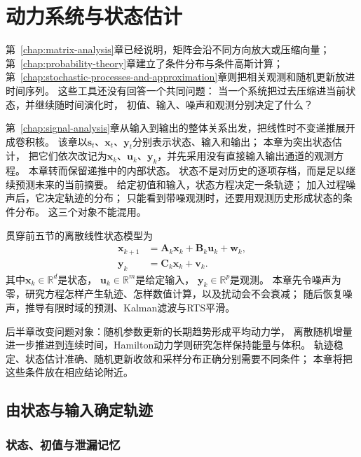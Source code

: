 \chapter{动力系统与状态估计}
\label{chap:dynamical-systems-and-state-estimation}

第~\ref{chap:matrix-analysis}章已经说明，矩阵会沿不同方向放大或压缩向量； 第~\ref{chap:probability-theory}章建立了条件分布与条件高斯计算；
第~\ref{chap:stochastic-processes-and-approximation}章则把相关观测和随机更新放进时间序列。
这些工具还没有回答一个共同问题： 当一个系统把过去压缩进当前状态，并继续随时间演化时，
初值、输入、噪声和观测分别决定了什么？

第~\ref{chap:signal-analysis}章从输入到输出的整体关系出发，把线性时不变递推展开成卷积核。
该章以$\bm{s}_{t}$、$\bm{x}_{t}$、$\bm{y}_{t}$分别表示状态、输入和输出； 本章为突出状态估计，
把它们依次改记为$\bm{x}_{k}$、$\bm{u}_{k}$、$\bm{y}_{k}$，并先采用没有直接输入输出通道的观测方程。
本章转而保留递推中的内部状态。 状态不是对历史的逐项存档，而是足以继续预测未来的当前摘要。
给定初值和输入，状态方程决定一条轨迹； 加入过程噪声后，它决定轨迹的分布； 只能看到带噪观测时，还要用观测历史形成状态的条件分布。
这三个对象不能混用。

贯穿前五节的离散线性状态模型为
\begin{align}
	\bm{x}_{k+1} & = \bm{A}_{k}\bm{x}_{k}+\bm{B}_{k}\bm{u}_{k}+\bm{w}_{k}, \label{eq:dynamical-linear-state-model} \\
	\bm{y}_{k}   & = \bm{C}_{k}\bm{x}_{k}+\bm{v}_{k}. \label{eq:dynamical-linear-observation-model}
\end{align}
其中$\bm{x}_{k}\in\mathbb{R}^{d}$是状态， $\bm{u}_{k}\in\mathbb{R}^{m}$是给定输入，
$\bm{y}_{k}\in\mathbb{R}^{p}$是观测。
本章先令噪声为零，研究方程怎样产生轨迹、怎样数值计算，以及扰动会不会衰减；
随后恢复噪声，推导有限时域的预测、Kalman滤波与RTS平滑。

后半章改变问题对象：随机参数更新的长期趋势形成平均动力学， 离散随机增量进一步推进到连续时间，Hamilton动力学则研究怎样保持能量与体积。
轨迹稳定、状态估计准确、随机更新收敛和采样分布正确分别需要不同条件； 本章将把这些条件放在相应结论附近。

\section{由状态与输入确定轨迹}
\label{sec:dynamical-difference-ode}

\subsection{状态、初值与泄漏记忆}

